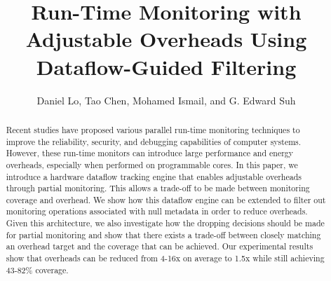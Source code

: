 \title{
Run-Time Monitoring with Adjustable Overheads Using Dataflow-Guided Filtering
}

{\author{Daniel Lo, Tao Chen, Mohamed Ismail, and G. Edward Suh}}

\date{}
\maketitle

\thispagestyle{empty}

\begin{abstract}

Recent studies have proposed various parallel run-time monitoring techniques to
improve the reliability, security, and debugging capabilities of computer
systems. However, these run-time monitors can introduce large performance and energy
overheads, especially when performed on programmable cores.
In this paper, we introduce a hardware dataflow tracking engine that enables
adjustable overheads through partial monitoring. This allows a trade-off to be
made between monitoring coverage and overhead. We show how this dataflow engine
can be extended to filter out monitoring operations associated with null
metadata in order to reduce overheads.
Given this architecture, we also investigate how the dropping decisions should be
made for partial monitoring and show that there exists a trade-off between closely
matching an overhead target and the coverage that can be achieved.
Our experimental results show that overheads can be reduced from 4-16x on
average to 1.5x while still achieving 43-82\% coverage.

\end{abstract}
